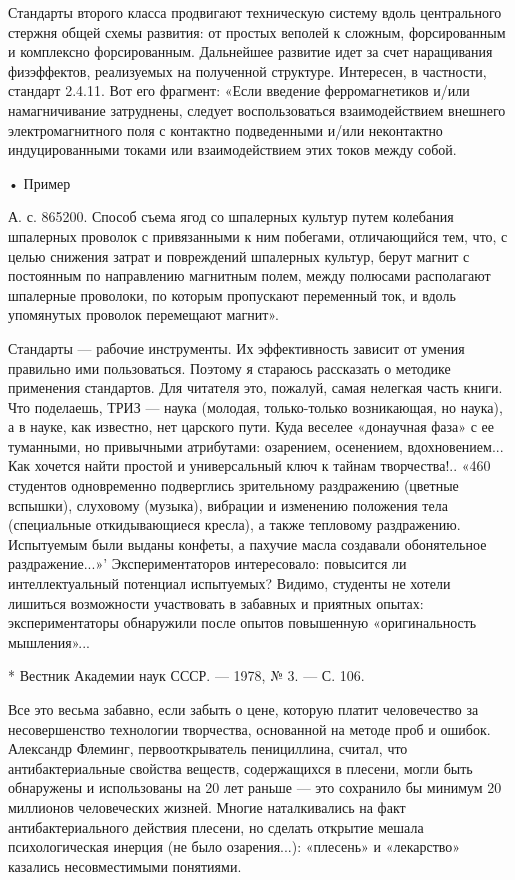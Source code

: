 Стандарты   второго  класса   продвигают  техническую   систему  вдоль
центрального  стержня  общей  схемы  развития: от  простых  веполей  к
сложным, форсированным и комплексно форсированным. Дальнейшее развитие
идет  за  счет  наращивания  физэффектов,  реализуемых  на  полученной
структуре. Интересен, в частности,  стандарт 2.4.11. Вот его фрагмент:
«Если  введение   ферромагнетиков  и/или   намагничивание  затруднены,
следует  воспользоваться  взаимодействием  внешнего  электромагнитного
поля с контактно подведенными и/или неконтактно индуцированными токами
или взаимодействием этих токов между собой.

• Пример

А. с. 865200.  Способ съема ягод со шпалерных  культур путем колебания
шпалерных проволок  с привязанными  к ним побегами,  отличающийся тем,
что, с  целью снижения затрат  и повреждений шпалерных  культур, берут
магнит  с постоянным  по направлению  магнитным полем,  между полюсами
располагают шпалерные проволоки, по которым пропускают переменный ток,
и вдоль упомянутых проволок перемещают магнит».


Стандарты  —   рабочие  инструменты.   Их  эффективность   зависит  от
умения  правильно ими  пользоваться. Поэтому  я стараюсь  рассказать о
методике  применения  стандартов.  Для читателя  это,  пожалуй,  самая
нелегкая  часть   книги.  Что   поделаешь,  ТРИЗ  —   наука  (молодая,
только-только  возникающая,  но  наука),  а  в  науке,  как  известно,
нет  царского пути.  Куда  веселее «донаучная  фаза»  с ее  туманными,
но  привычными атрибутами:  озарением, осенением,  вдохновением... Как
хочется  найти простой  и  универсальный ключ  к тайнам  творчества!..
«460  студентов   одновременно  подверглись   зрительному  раздражению
(цветные   вспышки),   слуховому   (музыка),  вибрации   и   изменению
положения   тела   (специальные   откидывающиеся  кресла),   а   также
тепловому  раздражению.  Испытуемым  были выданы  конфеты,  а  пахучие
масла   создавали   обонятельное  раздражение...»'   Экспериментаторов
интересовало:  повысится  ли  интеллектуальный  потенциал  испытуемых?
Видимо, студенты не хотели лишиться возможности участвовать в забавных
и приятных опытах: экспериментаторы обнаружили после опытов повышенную
«оригинальность мышления»...

*  Вестник Академии  наук  СССР. —  1978,  № 3.  —  С. 106.

Все  это   весьма  забавно,  если   забыть  о  цене,   которую  платит
человечество  за несовершенство  технологии творчества,  основанной на
методе проб и ошибок. Александр Флеминг, первооткрыватель пенициллина,
считал,  что   антибактериальные  свойства  веществ,   содержащихся  в
плесени,  могли быть  обнаружены и  использованы  на 20  лет раньше  —
это  сохранило бы  минимум  20 миллионов  человеческих жизней.  Многие
наталкивались на факт антибактериального  действия плесени, но сделать
открытие  мешала   психологическая  инерция  (не   было  озарения...):
«плесень» и «лекарство» казались несовместимыми понятиями.

